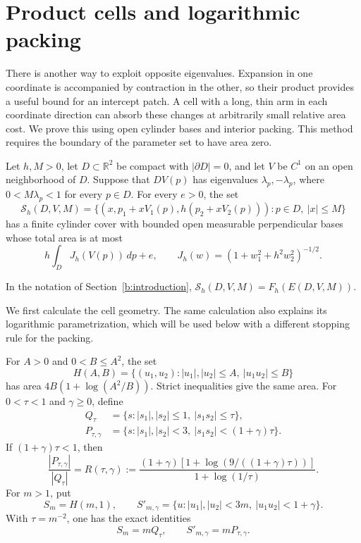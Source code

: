 \section{Product cells and logarithmic packing}
\label{b:product-section}

There is another way to exploit opposite eigenvalues.  Expansion in one
coordinate is accompanied by contraction in the other, so their product
provides a useful bound for an intercept patch.  A cell with a long, thin
arm in each coordinate direction can absorb these changes at arbitrarily
small relative area cost.  We prove this using open cylinder bases and
interior packing.  This method requires the boundary of the parameter
set to have area zero.

\begin{theorem}
\label{b:product}
Let $h,M>0$, let $D\subset\mathbb R^2$ be compact with
$|\partial D|=0$, and let $V$ be $C^1$ on an open neighborhood of $D$.
Suppose that $DV(p)$ has eigenvalues $\lambda_p,-\lambda_p$, where
$0<M\lambda_p<1$ for every $p\in D$.  For every $e>0$, the set
\[
 \mathcal S_h(D,V,M)=
 \{(x,p_1+xV_1(p),h(p_2+xV_2(p))):p\in D,\ |x|\le M\}
\]
has a finite cylinder cover with bounded open measurable perpendicular
bases whose total area is at most
\[
 h\int_D J_h(V(p))\,dp+e,
 \qquad J_h(w)=(1+w_1^2+h^2w_2^2)^{-1/2}.
\]
\end{theorem}

In the notation of Section~\ref{b:introduction},
$\mathcal S_h(D,V,M)=F_h(E(D,V,M))$.

We first calculate the cell geometry.  The same calculation also
explains its logarithmic parametrization, which will be used below with
a different stopping rule for the packing.

\begin{lemma}
\label{b:cell-geometry}
For $A>0$ and $0<B\le A^2$, the set
\[
 H(A,B)=\{(u_1,u_2):|u_1|,|u_2|\le A,\ |u_1u_2|\le B\}
\]
has area $4B(1+\log(A^2/B))$.  Strict inequalities give the same area.
For $0<\tau<1$ and $\gamma\ge0$, define
\[
 \begin{split}
 Q_\tau&=\{s:|s_1|,|s_2|\le1,\ |s_1s_2|\le\tau\},\\
 P_{\tau,\gamma}&=\{s:|s_1|,|s_2|<3,
                         \ |s_1s_2|<(1+\gamma)\tau\}.
 \end{split}
\]
If $(1+\gamma)\tau<1$, then
\begin{equation}
 \frac{|P_{\tau,\gamma}|}{|Q_\tau|}
 =R(\tau,\gamma)
 :=\frac{(1+\gamma)[1+\log(9/((1+\gamma)\tau))]}
          {1+\log(1/\tau)}.
 \label{b:cell-ratio}
\end{equation}
For $m>1$, put
\[
 S_m=H(m,1),\qquad
 S'_{m,\gamma}=\{u:|u_1|,|u_2|<3m,
                            \ |u_1u_2|<1+\gamma\}.
\]
With $\tau=m^{-2}$, one has the exact identities
\begin{equation}
 S_m=mQ_\tau,\qquad S'_{m,\gamma}=mP_{\tau,\gamma}.
 \label{b:cell-dilation}
\end{equation}
\end{lemma}

